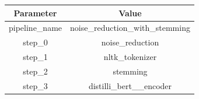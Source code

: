 \begin{tabular}{|c||c|}
\toprule
Parameter & Value \\ \midrule
\midrule
pipeline\_name & noise\_reduction\_with\_stemming \\ \midrule
step\_0 & noise\_reduction \\ \midrule
step\_1 & nltk\_tokenizer \\ \midrule
step\_2 & stemming \\ \midrule
step\_3 & distilli\_bert\_\_encoder \\ \midrule
\bottomrule
\end{tabular}
